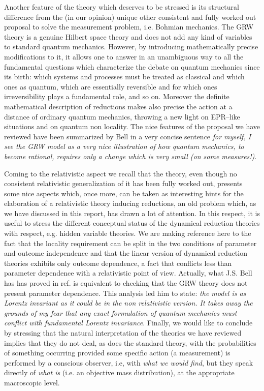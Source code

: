 \documentclass[12pt]{article}
\begin{document}
Another feature of the theory which deserves to be stressed is its
structural difference from the (in our opinion) unique other
consistent and fully worked out proposal to solve the measurement
problem, i.e. Bohmian mechanics. The GRW theory is a genuine
Hilbert space theory and does not add any kind of variables to
standard quantum mechanics. However, by introducing mathematically
precise modifications to it, it allows one  to answer in an
unambiguous way to all the fundamental questions which characterize
the debate on quantum mechanics since its birth: which systems and
processes must be treated as classical and which ones as quantum,
which are essentially reversible and for which ones
irreversibility plays a fundamental role, and so on. Moreover the
definite mathematical description of reductions makes also precise
the action at a distance of ordinary quantum mechanics, throwing a
new light on EPR--like situations and on quantum non locality. The
nice features of the proposal we have reviewed have been
summarized by Bell in  a very concise sentence \cite{bells} {\it
for myself, I see the GRW model as a very nice illustration of how
quantum mechanics, to become rational, requires only a change
which is very small (on some measures!)}.

Coming to the relativistic aspect we recall that the theory, even
though no consistent relativistic generalization of it has  been
fully worked out, presents some nice aspects which, once more, can
be taken as interesting hints for the elaboration of a
relativistic theory inducing reductions, an old problem which, as
we have discussed in this report, has drawn a lot of attention. In
this respect, it is useful to stress the different conceptual
status of the dynamical reduction theories with respect, e.g.
hidden variable theories. We are making reference here to the fact
that the locality requirement can be split in the two conditions
of parameter and outcome independence and that  the linear version of
dynamical reduction theories  exhibits only outcome dependence, a fact
that conflicts less than parameter dependence with a relativistic point
of view.  Actually, what J.S.  Bell has has proved in ref.\cite{bells} is
equivalent to checking that the GRW theory does not present parameter
dependence. This analysis led him to state: {\it the model is as Lorentz
invariant as it could be in the non relativistic version. It takes away
the grounds of my fear that any exact formulation of quantum mechanics
must conflict with fundamental Lorentz invariance}. Finally, we would
like to conclude by stressing that the natural interpretation of the
theories we have reviewed implies that they do not deal, as does  the
standard theory, with the probabilities of something occurring provided
some specific action (a measurement) is performed by a conscious
observer, i.e, with {\it what we would find},  but they speak directly of
{\it what  is}  (i.e. an objective mass distribution), at the appropriate
macroscopic level.
\end{document}

